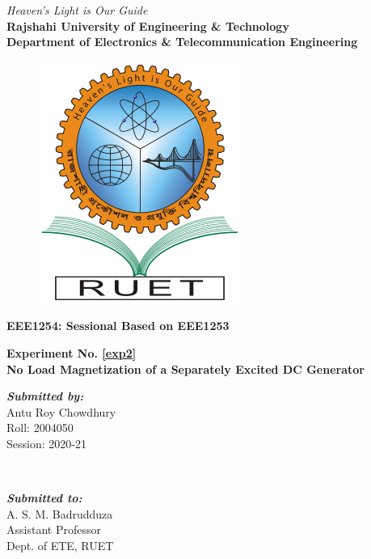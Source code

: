 \begin{titlepage}
\begin{center}
\textit{Heaven's Light is Our Guide}
\\[0.5cm]
\textbf{\Large Rajshahi University of Engineering \& Technology}
\\[0.3cm] 
\textbf{\large Department of Electronics \& Telecommunication Engineering}
\\[0.2cm]
\begin{figure}[!htbp]
    \centering
    \includegraphics[scale=0.3]{Figures/logo_ruet}
    \label{fig:RUET logo}
\end{figure}
\textbf{\Large EEE1254: Sessional Based on EEE1253 }
\\[0.5cm]
\myrule[1pt][5pt]


\textbf{\Large  Experiment No. \ref{exp2}}
\\[.25cm]
\textbf{\large No Load Magnetization of a Separately Excited DC Generator}
\\ 
\myrule[1pt][5pt] 
\begin{minipage}{0.4\textwidth}
\vspace{0.5cm}
\begin{flushleft} 
\emph{\textbf{\large Submitted by:}}
\\
Antu Roy Chowdhury \\
Roll: 2004050 \\
Session: 2020-21
\end{flushleft}
\end{minipage}
~
\begin{minipage}{0.4\textwidth}
\vspace{0.5cm}
\begin{flushright} 
\emph{\textbf{\large Submitted to:}} 
\\
A. S. M. Badrudduza
\\
Assistant Professor
\\
Dept. of ETE, RUET
\\
\end{flushright}
\end{minipage}\\[0.7cm]
\makeatother


\end{center}
\end{titlepage}
